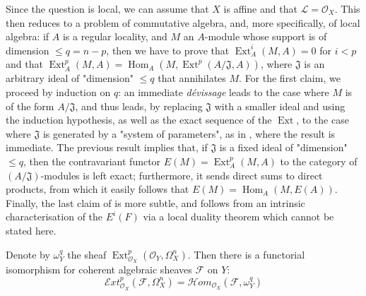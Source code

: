\begin{cproof}
  Since the question is local, we can assume that $X$ is affine and that $\mathcal{L}=\mathcal{O}_X$.
  This then reduces to a problem of commutative algebra, and, more specifically, of local algebra:
  if $A$ is a regular locality, and $M$ an $A$-module whose support is of dimension $\leqslant q=n-p$, then we have to prove that $\operatorname{Ext}_A^i(M,A)=0$ for $i<p$ and that $\operatorname{Ext}_A^p(M,A)=\operatorname{Hom}_A(M,\operatorname{Ext}^p(A/\mathfrak{J},A))$, where $\mathfrak{J}$ is an arbitrary ideal of "dimension" $\leqslant q$ that annihilates $M$.
  For the first claim, we proceed by induction on $q$:
  an immediate \emph{dévissage} leads to the case where $M$ is of the form $A/\mathfrak{J}$, and thus leads, by replacing $\mathfrak{J}$ with a smaller ideal and using the induction hypothesis, as well as the exact sequence of the $\operatorname{Ext}$, to the case where $\mathfrak{J}$ is generated by a "system of parameters", as in , where the result is immediate.
  The previous result implies that, if $\mathfrak{J}$ is a fixed ideal of "dimension" $\leqslant q$, then the contravariant functor $E(M)=\operatorname{Ext}_A^p(M,A)$ to the category of $(A/\mathfrak{J})$-modules is left exact;
  furthermore, it sends direct sums to direct products, from which it easily follows that $E(M)=\operatorname{Hom}_A(M,E(A))$.
  Finally, the last claim of  is more subtle, and follows from an intrinsic characterisation of the $E^i(F)$ via a local duality theorem which cannot be stated here.
\end{cproof}

\begin{corollary}\label{fga1-proposition-5-corollary}
  Denote by $\omega_Y^q$ the sheaf $\operatorname{Ext}_{\mathcal{O}_X}^p(\mathcal{O}_Y,\Omega_X^n)$.
  Then there is a functorial isomorphism for coherent algebraic sheaves $\mathcal{F}$ on $Y$:
  \begin{equation}\tag{3.8}\label{fga1-equation-3.8}
    \mathcal{E}xt_{\mathcal{O}_X}^p(\mathcal{F},\Omega_X^n) = \mathcal{H}om_{\mathcal{O}_X}(\mathcal{F},\omega_Y^q)
  \end{equation}
\end{corollary}
